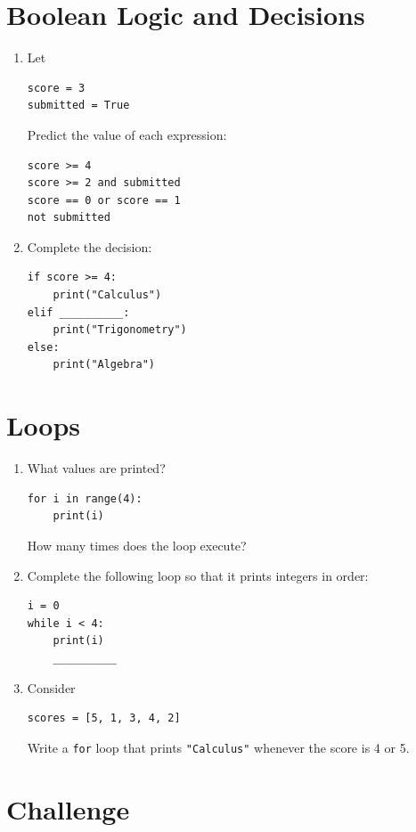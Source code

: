 \documentclass{article}
\begin{document}
\section{Boolean Logic and Decisions}

\begin{enumerate}
\item Let
\begin{verbatim}
score = 3
submitted = True
\end{verbatim}
Predict the value of each expression:
\begin{verbatim}
score >= 4
score >= 2 and submitted
score == 0 or score == 1
not submitted
\end{verbatim}
\item Complete the decision:
\begin{verbatim}
if score >= 4:
    print("Calculus")
elif __________:
    print("Trigonometry")
else:
    print("Algebra")
\end{verbatim}
\end{enumerate}

\section{Loops}

\begin{enumerate}
\item What values are printed?
\begin{verbatim}
for i in range(4):
    print(i)
\end{verbatim}
How many times does the loop execute?
\item Complete the following loop so that it prints integers in order:
\begin{verbatim}
i = 0
while i < 4:
    print(i)
    __________
\end{verbatim}
\item Consider
\begin{verbatim}
scores = [5, 1, 3, 4, 2]
\end{verbatim}
Write a \texttt{for} loop that prints \texttt{"Calculus"} whenever the score is 4 or 5.
\end{enumerate}

\section{Challenge}
\end{document}
